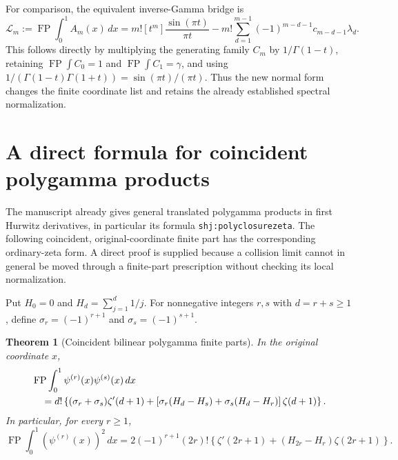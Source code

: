 \documentclass[11pt,a4paper]{article}
\numberwithin{equation}{section}
\theoremstyle{plain}
\newtheorem{theorem}{Theorem}[section]
\theoremstyle{definition}
\theoremstyle{remark}
\begin{document}
For comparison, the equivalent inverse-Gamma bridge is
\begin{equation}\label{dq:inheritedAbridge}
 \mathcal L_m:=\operatorname{FP}\int_0^1 A_m(x)\,dx
 =m![t^m]\frac{\sin(\pi t)}{\pi t}
  -m!\sum_{d=1}^{m-1}(-1)^{m-d-1}c_{m-d-1}\lambda_d.
\end{equation}
This follows directly by multiplying the generating family $C_m$
by $1/\Gamma(1-t)$, retaining
$\operatorname{FP}\int C_0=1$ and
$\operatorname{FP}\int C_1=\gamma$, and using
$1/(\Gamma(1-t)\Gamma(1+t))=\sin(\pi t)/(\pi t)$.
Thus the new normal form changes the finite coordinate list and
retains the already established spectral normalization.

\section{A direct formula for coincident polygamma products}
\label{dq:bilinearsection}

The manuscript already gives general translated polygamma products
in first Hurwitz derivatives, in particular its formula
\texttt{shj:polyclosurezeta}. The following coincident, original-coordinate
finite part has the corresponding ordinary-zeta form. A direct proof
is supplied because a collision limit cannot in general be moved through
a finite-part prescription without checking its local normalization.

Put $H_0=0$ and $H_d=\sum_{j=1}^d1/j$.
For nonnegative integers $r,s$ with $d=r+s\ge1$, define
$\sigma_r=(-1)^{r+1}$ and $\sigma_s=(-1)^{s+1}$.

\begin{theorem}[Coincident bilinear polygamma finite parts]
\label{dq:bilinear}
In the original coordinate $x$,
\begin{align}
 &\operatorname{FP}\int_0^1\psi^{(r)}(x)\psi^{(s)}(x)\,dx\notag\\
 &\quad=d!\left\{(\sigma_r+\sigma_s)\zeta'(d+1)
 +\left[\sigma_r(H_d-H_s)+\sigma_s(H_d-H_r)\right]
                                      \zeta(d+1)\right\}.
 \label{dq:bilinearformula}
\end{align}
In particular, for every $r\ge1$,
\begin{equation}\label{dq:squareformula}
 \operatorname{FP}\int_0^1(\psi^{(r)}(x))^2\,dx
 =2(-1)^{r+1}(2r)!
    \left\{\zeta'(2r+1)+(H_{2r}-H_r)\zeta(2r+1)\right\}.
\end{equation}
\end{theorem}
\end{document}
